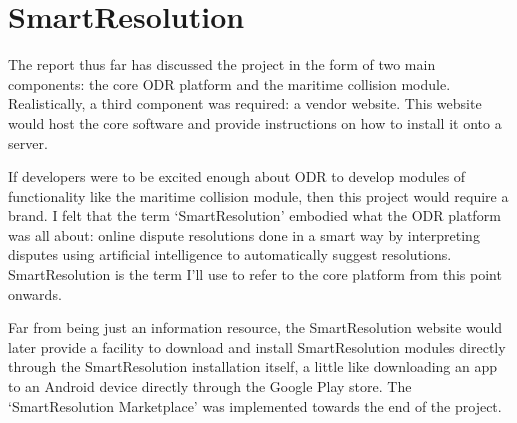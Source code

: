 \section{SmartResolution}

The report thus far has discussed the project in the form of two main components: the core ODR platform and the maritime collision module. Realistically, a third component was required: a vendor website. This website would host the core software and provide instructions on how to install it onto a server.

If developers were to be excited enough about ODR to develop modules of functionality like the maritime collision module, then this project would require a brand. I felt that the term `SmartResolution' embodied what the ODR platform was all about: online dispute resolutions done in a smart way by interpreting disputes using artificial intelligence to automatically suggest resolutions. SmartResolution is the term I'll use to refer to the core platform from this point onwards.

Far from being just an information resource, the SmartResolution website would later provide a facility to download and install SmartResolution modules directly through the SmartResolution installation itself, a little like downloading an app to an Android device directly through the Google Play store. The `SmartResolution Marketplace' was implemented towards the end of the project.
